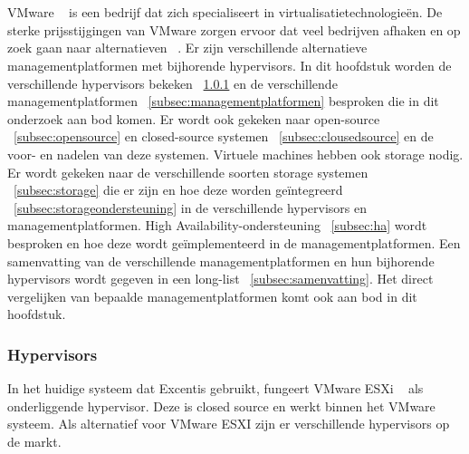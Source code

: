 
\chapter{}%
\label{ch:stand-van-zaken}


VMware ~\autocite{vmware} is een bedrijf dat zich specialiseert in virtualisatietechnologieën. De sterke prijsstijgingen van VMware zorgen ervoor dat veel bedrijven afhaken en op zoek gaan naar alternatieven ~\autocite{Hale2024}.
Er zijn verschillende alternatieve managementplatformen met bijhorende hypervisors.
In dit hoofdstuk worden de verschillende hypervisors bekeken  ~\ref{subsec:Hypervisors} en de verschillende managementplatformen ~\ref{subsec:managementplatformen} besproken die in dit onderzoek aan bod komen.
Er wordt ook gekeken naar open-source ~\ref{subsec:opensource} en closed-source systemen  ~\ref{subsec:clousedsource} en de voor- en nadelen van deze systemen.
Virtuele machines hebben ook  storage nodig. Er wordt gekeken naar de verschillende soorten storage systemen ~\ref{subsec:storage} die er zijn en hoe deze worden geïntegreerd  ~\ref{subsec:storageondersteuning} in de verschillende hypervisors en managementplatformen.
High Availability-ondersteuning ~\ref{subsec:ha} wordt besproken en hoe deze wordt geïmplementeerd in de managementplatformen.
Een samenvatting van de verschillende managementplatformen en hun bijhorende hypervisors wordt gegeven in een long-list  ~\ref{subsec:samenvatting}.
Het direct vergelijken van bepaalde managementplatformen komt ook aan bod in dit hoofdstuk. 
\subsection{Hypervisors}\label{subsec:Hypervisors}
In het huidige systeem dat Excentis gebruikt, fungeert VMware ESXi ~\autocite{vmware} als onderliggende hypervisor. Deze is closed source en werkt binnen het VMware systeem. Als alternatief voor VMware ESXI zijn er verschillende hypervisors op de markt.

